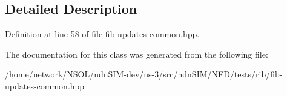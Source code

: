 \subsection{Detailed Description}


Definition at line 58 of file fib-\/updates-\/common.\+hpp.



The documentation for this class was generated from the following file\+:\begin{DoxyCompactItemize}
\item 
/home/network/\+N\+S\+O\+L/ndn\+S\+I\+M-\/dev/ns-\/3/src/ndn\+S\+I\+M/\+N\+F\+D/tests/rib/fib-\/updates-\/common.\+hpp\end{DoxyCompactItemize}
